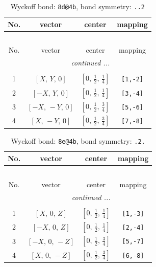 \documentclass[fleqn,8pt]{jsarticle}
\begin{document}
\begin{longtable}{cccc}
\caption{Wyckoff bond: {\tt 8d@4b}, bond symmetry: {\tt ..2}}
 \\
 \hline \hline
No. & vector & center & mapping \\ \hline \endfirsthead

\multicolumn{3}{l}{\tablename\ \thetable{}} \\
 \hline \hline
No. & vector & center & mapping \\ \hline \endhead

 \hline \hline
\multicolumn{3}{r}{\footnotesize\it continued ...} \\ \endfoot

 \hline \hline
\multicolumn{3}{r}{} \\ \endlastfoot

1 & $\left[ X,\, Y,\, 0 \right]$ & $\left[ 0,\, \frac{1}{2},\, \frac{1}{4} \right]$ & {\tt [1,-2]} \\ \hline
2 & $\left[ - X,\, Y,\, 0 \right]$ & $\left[ 0,\, \frac{1}{2},\, \frac{1}{4} \right]$ & {\tt [3,-4]} \\ \hline
3 & $\left[ - X,\, - Y,\, 0 \right]$ & $\left[ 0,\, \frac{1}{2},\, \frac{3}{4} \right]$ & {\tt [5,-6]} \\ \hline
4 & $\left[ X,\, - Y,\, 0 \right]$ & $\left[ 0,\, \frac{1}{2},\, \frac{3}{4} \right]$ & {\tt [7,-8]} \\
\end{longtable}
\renewcommand{\arraystretch}{1.2}
\begin{longtable}{cccc}
\caption{Wyckoff bond: {\tt 8e@4b}, bond symmetry: {\tt .2.}}
 \\
 \hline \hline
No. & vector & center & mapping \\ \hline \endfirsthead

\multicolumn{3}{l}{\tablename\ \thetable{}} \\
 \hline \hline
No. & vector & center & mapping \\ \hline \endhead

 \hline \hline
\multicolumn{3}{r}{\footnotesize\it continued ...} \\ \endfoot

 \hline \hline
\multicolumn{3}{r}{} \\ \endlastfoot

1 & $\left[ X,\, 0,\, Z \right]$ & $\left[ 0,\, \frac{1}{2},\, \frac{1}{4} \right]$ & {\tt [1,-3]} \\ \hline
2 & $\left[ - X,\, 0,\, Z \right]$ & $\left[ 0,\, \frac{1}{2},\, \frac{1}{4} \right]$ & {\tt [2,-4]} \\ \hline
3 & $\left[ - X,\, 0,\, - Z \right]$ & $\left[ 0,\, \frac{1}{2},\, \frac{3}{4} \right]$ & {\tt [5,-7]} \\ \hline
4 & $\left[ X,\, 0,\, - Z \right]$ & $\left[ 0,\, \frac{1}{2},\, \frac{3}{4} \right]$ & {\tt [6,-8]} \\
\end{longtable}
\end{document}
